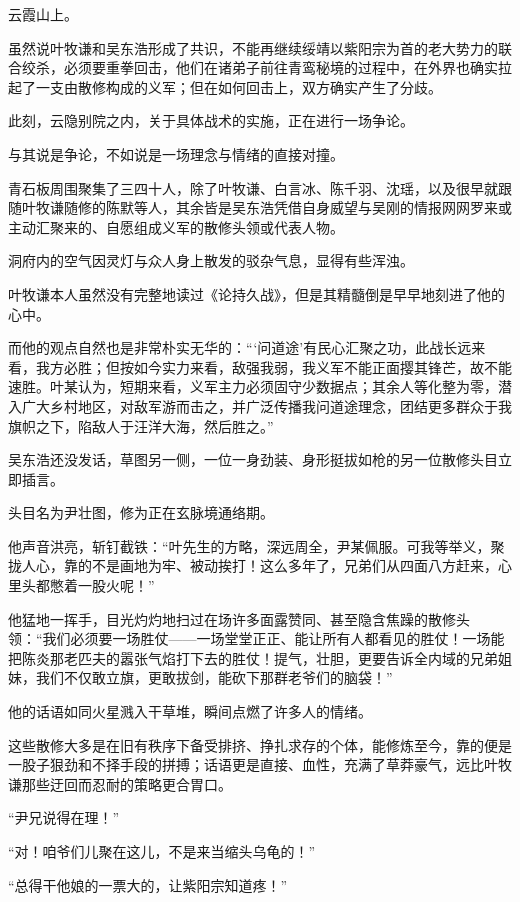 \vspace{2em}

云霞山上。

虽然说叶牧谦和吴东浩形成了共识，不能再继续绥靖以紫阳宗为首的老大势力的联合绞杀，必须要重拳回击，他们在诸弟子前往青鸾秘境的过程中，在外界也确实拉起了一支由散修构成的义军；但在如何回击上，双方确实产生了分歧。

此刻，云隐别院之内，关于具体战术的实施，正在进行一场争论。

与其说是争论，不如说是一场理念与情绪的直接对撞。

青石板周围聚集了三四十人，除了叶牧谦、白言冰、陈千羽、沈瑶，以及很早就跟随叶牧谦随修的陈默等人，其余皆是吴东浩凭借自身威望与吴刚的情报网网罗来或主动汇聚来的、自愿组成义军的散修头领或代表人物。

洞府内的空气因灵灯与众人身上散发的驳杂气息，显得有些浑浊。

叶牧谦本人虽然没有完整地读过《论持久战》，但是其精髓倒是早早地刻进了他的心中。

而他的观点自然也是非常朴实无华的：“‘问道途’有民心汇聚之功，此战长远来看，我方必胜；但按如今实力来看，敌强我弱，我义军不能正面撄其锋芒，故不能速胜。叶某认为，短期来看，义军主力必须固守少数据点；其余人等化整为零，潜入广大乡村地区，对敌军游而击之，并广泛传播我问道途理念，团结更多群众于我旗帜之下，陷敌人于汪洋大海，然后胜之。”

吴东浩还没发话，草图另一侧，一位一身劲装、身形挺拔如枪的另一位散修头目立即插言。

头目名为尹壮图，修为正在玄脉境通络期。

他声音洪亮，斩钉截铁：“叶先生的方略，深远周全，尹某佩服。可我等举义，聚拢人心，靠的不是画地为牢、被动挨打！这么多年了，兄弟们从四面八方赶来，心里头都憋着一股火呢！”

他猛地一挥手，目光灼灼地扫过在场许多面露赞同、甚至隐含焦躁的散修头领：“我们必须要一场胜仗——一场堂堂正正、能让所有人都看见的胜仗！一场能把陈炎那老匹夫的嚣张气焰打下去的胜仗！提气，壮胆，更要告诉全内域的兄弟姐妹，我们不仅敢立旗，更敢拔剑，能砍下那群老爷们的脑袋！”

他的话语如同火星溅入干草堆，瞬间点燃了许多人的情绪。

这些散修大多是在旧有秩序下备受排挤、挣扎求存的个体，能修炼至今，靠的便是一股子狠劲和不择手段的拼搏；话语更是直接、血性，充满了草莽豪气，远比叶牧谦那些迂回而忍耐的策略更合胃口。

“尹兄说得在理！”

“对！咱爷们儿聚在这儿，不是来当缩头乌龟的！”

“总得干他娘的一票大的，让紫阳宗知道疼！”

